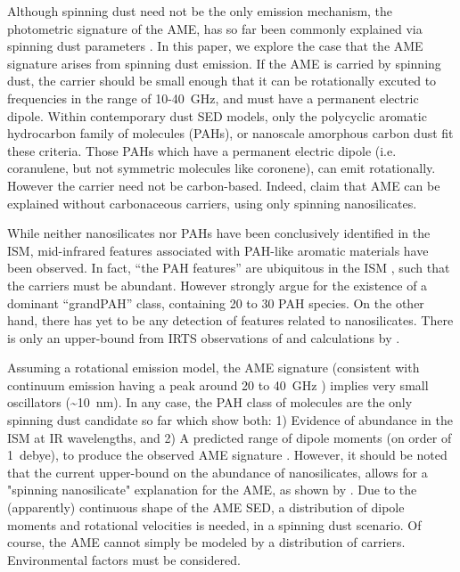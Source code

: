 \documentclass[preprint2,longabstract]{aastex}
\begin{document}
     Although spinning dust need not be the only emission mechanism, the photometric signature of the AME, has so far been commonly explained via spinning dust parameters \citep{ysard11,ali-haimoud10}. In this paper, we explore the case that the AME signature arises from spinning dust emission. If the AME is carried by spinning dust, the carrier should be small enough that it can be rotationally excuted to frequencies in the range of 10-40~GHz, and must have a permanent electric dipole. Within contemporary dust SED models, only the polycyclic aromatic hydrocarbon family of molecules (PAHs), or nanoscale amorphous carbon dust fit these criteria. Those PAHs which have a permanent electric dipole (i.e. coranulene, but not symmetric molecules like coronene), can emit rotationally. However the carrier need not be carbon-based. Indeed, \cite{hensley17a} claim that AME can be explained without carbonaceous carriers, using only spinning nanosilicates.

     While neither nanosilicates nor PAHs have been conclusively identified in the ISM, mid-infrared features associated with PAH-like aromatic materials have been observed. In fact, ``the PAH features'' are ubiquitous in the ISM \citep{giard94,onaka96,onaka00}, such that the carriers must be abundant.  However \cite{andrews15} strongly argue for the  existence of a dominant ``grandPAH'' class, containing 20 to 30 PAH species. On the other hand, there has yet to be any detection of features related to nanosilicates. There is only an upper-bound from IRTS observations of \cite{onaka96} and calculations by \cite{li01}.

     Assuming a rotational emission model, the AME signature (consistent with continuum emission having a peak around 20 to 40~GHz ) implies very small oscillators (\textasciitilde{}10~nm). In any case, the PAH class of molecules are the only spinning dust candidate so far which show both: 1) Evidence of abundance in the ISM at IR wavelengths, and 2) A predicted range of dipole moments (on order of 1~debye), to produce the observed AME signature \citep{draine98b, lovas05, thorwirth07}. However, it should be noted that the current upper-bound on the abundance of nanosilicates, allows for a "spinning nanosilicate" explanation for the AME, as shown by \cite{hensley17a}. Due to the (apparently) continuous shape of the AME SED, a distribution of dipole moments and rotational velocities is needed, in a spinning dust scenario. Of course, the AME cannot simply be modeled by a distribution of carriers. Environmental factors must be considered.
\end{document}
